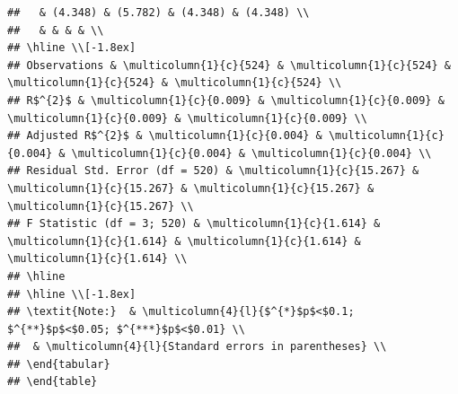 \documentclass[
  12pt,
  landscape]{article}
\begin{document}
\begin{verbatim}
##   & (4.348) & (5.782) & (4.348) & (4.348) \\ 
##   & & & & \\ 
## \hline \\[-1.8ex] 
## Observations & \multicolumn{1}{c}{524} & \multicolumn{1}{c}{524} & \multicolumn{1}{c}{524} & \multicolumn{1}{c}{524} \\ 
## R$^{2}$ & \multicolumn{1}{c}{0.009} & \multicolumn{1}{c}{0.009} & \multicolumn{1}{c}{0.009} & \multicolumn{1}{c}{0.009} \\ 
## Adjusted R$^{2}$ & \multicolumn{1}{c}{0.004} & \multicolumn{1}{c}{0.004} & \multicolumn{1}{c}{0.004} & \multicolumn{1}{c}{0.004} \\ 
## Residual Std. Error (df = 520) & \multicolumn{1}{c}{15.267} & \multicolumn{1}{c}{15.267} & \multicolumn{1}{c}{15.267} & \multicolumn{1}{c}{15.267} \\ 
## F Statistic (df = 3; 520) & \multicolumn{1}{c}{1.614} & \multicolumn{1}{c}{1.614} & \multicolumn{1}{c}{1.614} & \multicolumn{1}{c}{1.614} \\ 
## \hline 
## \hline \\[-1.8ex] 
## \textit{Note:}  & \multicolumn{4}{l}{$^{*}$p$<$0.1; $^{**}$p$<$0.05; $^{***}$p$<$0.01} \\ 
##  & \multicolumn{4}{l}{Standard errors in parentheses} \\ 
## \end{tabular} 
## \end{table}
\end{verbatim}
\end{document}
